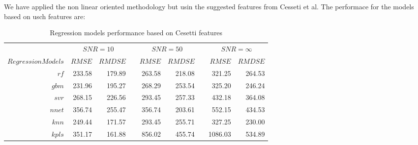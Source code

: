 %
% 


%

We have applied the non linear oriented methodology but usin the suggested features from Cesseti et al.
The performace for the models based on usch features are:

\begin{table}\centering
{}
\begin{tabular}{@{}rrrcrrcrr@{}}\toprule
& \multicolumn{2}{c}{$SNR = 10$} & \phantom{ab}& \multicolumn{2}{c}{$SNR = 50$} &
\phantom{ab} & \multicolumn{2}{c}{$SNR = \infty$}\\
\cmidrule{2-3} \cmidrule{5-6} \cmidrule{8-9}

$Regression Models$ & $RMSE$ & $RMDSE$ && $RMSE$ & $RMDSE$ && $RMSE$ & $RMDSE$ \\ \midrule
$rf $               & 233.58 & 179.89 && 263.58 & 218.08 && 321.25 & 264.53 \\
$ gbm $              & 231.96 & 195.27 && 268.29 & 253.54 && 325.20 & 246.24 \\
$ svr $             & 268.15 & 226.56 && 293.45 & 257.33 && 432.18 & 364.08 \\
$ nnet $            & 356.74 & 255.47 && 356.74 & 203.61 && 552.15 & 434.53 \\
$ knn $             & 249.44 & 171.57 && 293.45 & 255.71 && 327.25 & 230.00  \\
$ kpls $            & 351.17 & 161.88 && 856.02 & 455.74 && 1086.03 & 534.89 \\

\hline
\end{tabular}
\caption {Regression models performance based on Cesetti features} 
\label{tab:tab_CS_Model}
\end{table}




